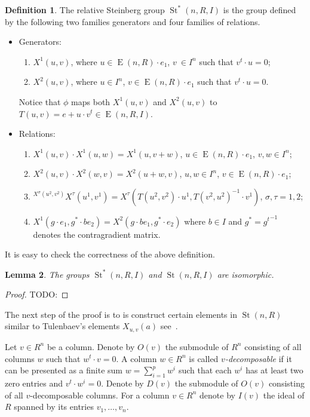 \documentclass[12pt]{amsart}
\theoremstyle{plain} \declaretheorem[name=Theorem, Refname={Theorem,Theorems}]{thm} \Crefname{thm}{Theorem}{Theorems}
\numberwithin{equation}{section}
\newtheorem{lemma}{Lemma} \numberwithin{lemma}{section} \Crefname{lemma}{Lemma}{Lemmas}
\theoremstyle{definition} \newtheorem{dfn}[lemma]{Definition} \Crefname{dfn}{Definition}{Definitions}
\theoremstyle{remark} \newtheorem{rem}[lemma]{Remark} \Crefname{rem}{Remark}{Remarks}
\newcommand{\St}{\operatorname{\mathrm{St}}}
\newcommand{\E}{\operatorname{\mathrm{E}}}
\begin{document}
\begin{dfn}
 The relative Steinberg group $\St^*(n,R, I)$ is the group defined by the following two
 families generators and four families of relations.
 \begin{itemize}
  \item Generators:
  \begin{enumerate}
  \item $X^1(u, v)$, where $u \in \E(n,R) \cdot e_1$, $v\ \in I^n$ such that $v^t \cdot u = 0$;
  \item $X^2(u, v)$, where $u \in I^n$, $v \in \E(n,R) \cdot e_1$ such that $v^t \cdot u = 0$.
 \end{enumerate}
  Notice that $\phi$ maps both $X^1(u, v)$ and $X^2(u, v)$ to $T(u, v) = e + u \cdot v^t \in \E(n, R, I)$.
  \item Relations:
  \begin{enumerate}
  \item $X^1(u, v) \cdot X^1(u, w) = X^1(u, v+w)$, $u \in \E(n,R) \cdot e_1$, $v, w \in I^n$;
  \item $X^2(u, v) \cdot X^2(w, v) = X^2(u+w, v)$, $u, w \in I^n$, $v \in \E(n,R) \cdot e_1$;
  \item ${}^{X^\sigma(u^2, v^2)} \! X^\tau(u^1, v^1) = X^\tau(T(u^2, v^2) \cdot u^1, T(v^2, u^2)^{-1} \cdot v^1)$, $\sigma, \tau = 1,2$;
  \item $X^1(g \cdot e_1, g^* \cdot be_2) = X^2(g \cdot be_1, g^* \cdot e_2)$ where $b\in I$ and $g^* = {g^t}^{-1}$ denotes the contragradient matrix.
 \end{enumerate}
 \end{itemize}
\end{dfn}
It is easy to check the correctness of the above definition.

\begin{lemma}
 The groups $\St^*(n, R, I)$ and $\St(n, R, I)$ are isomorphic.
\end{lemma}
\begin{proof}
 TODO: 
\end{proof}

The next step of the proof is to is construct certain elements in $\St(n, R)$ similar to Tulenbaev's elements $X_{u,v}(a)$ see~\cite[\S~1]{T}.

Let $v\in R^n$ be a column.
Denote by $O(v)$ the submodule of $R^n$ consisting of all columns $w$ such that $w^t \cdot v = 0$.
A column $w\in R^n$ is called \emph{$v$-decomposable} if it can be presented as a finite sum $w = \sum\limits_{i=1}^p w^i$ such that each $w^i$ has at least two zero entries and $v^t \cdot w^i = 0$. 
Denote by $D(v)$ the submodule of $O(v)$ consisting of all $v$-decomposable columns.
For a column $v\in R^n$ denote by $I(v)$ the ideal of $R$ spanned by its entries $v_1,\ldots, v_n$.
\end{document}
